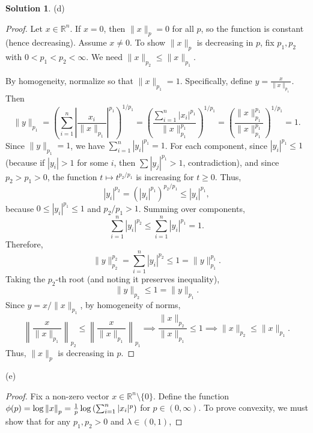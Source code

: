 \documentclass[12pt]{article}
\theoremstyle{definition}
\newtheorem*{solution}{\normalfont\textbf{Solution}}
\begin{document}
\begin{enumerate}[leftmargin=*]
\begin{solution}
        \item[(d)] 
            \begin{proof}
                Let \( x \in \mathbb{R}^n \). If \( x = 0 \), then \( \|x\|_p = 0 \) for all \( p \), so the function is constant (hence decreasing). Assume \( x \neq 0 \). To show \( \|x\|_p \) is decreasing in \( p \), fix \( p_1, p_2 \) with \( 0 < p_1 < p_2 < \infty \). We need \( \|x\|_{p_2} \leq \|x\|_{p_1} \).

                By homogeneity, normalize so that \( \|x\|_{p_1} = 1 \). Specifically, define \( y = \frac{x}{\|x\|_{p_1}} \). 
                Then \[ \|y\|_{p_1} = \left( \sum_{i=1}^n \left| \frac{x_i}{\|x\|_{p_1}} \right|^{p_1} \right)^{1/p_1} = \left( \frac{ \sum_{i=1}^n |x_i|^{p_1} }{ \|x\|_{p_1}^{p_1} } \right)^{1/p_1} = \left( \frac{ \|x\|_{p_1}^{p_1} }{ \|x\|_{p_1}^{p_1} } \right)^{1/p_1} = 1 .\] 
                Since \( \|y\|_{p_1} = 1 \), we have \( \sum_{i=1}^n |y_i|^{p_1} = 1 \). For each component, since \( |y_i|^{p_1} \leq 1 \) (because if \( |y_i| > 1 \) for some \( i \), then \( \sum |y_j|^{p_1} > 1 \), contradiction), and since \( p_2 > p_1 > 0 \), the function \( t \mapsto t^{p_2 / p_1} \) is increasing for \( t \geq 0 \). Thus,
                \[
                |y_i|^{p_2} = \left( |y_i|^{p_1} \right)^{p_2 / p_1} \leq |y_i|^{p_1},
                \]
                because \( 0 \leq |y_i|^{p_1} \leq 1 \) and \( p_2 / p_1 > 1 \). Summing over components,
                \[
                \sum_{i=1}^n |y_i|^{p_2} \leq \sum_{i=1}^n |y_i|^{p_1} = 1.
                \]
                Therefore,
                \[
                \|y\|_{p_2}^{p_2} = \sum_{i=1}^n |y_i|^{p_2} \leq 1 = \|y\|_{p_1}^{p_1}.
                \]
                Taking the \( p_2 \)-th root (and noting it preserves inequality),
                \[
                \|y\|_{p_2} \leq 1 = \|y\|_{p_1}.
                \]
                Since \( y = x / \|x\|_{p_1} \), by homogeneity of norms,
                \[
                \left\| \frac{x}{\|x\|_{p_1}} \right\|_{p_2} \leq \left\| \frac{x}{\|x\|_{p_1}} \right\|_{p_1} \implies \frac{ \|x\|_{p_2} }{ \|x\|_{p_1} } \leq 1 \implies \|x\|_{p_2} \leq \|x\|_{p_1}.
                \]
                Thus, \( \|x\|_p \) is decreasing in \( p \).
            \end{proof}
        \item[(e)]
            \begin{proof}
                Fix a non-zero vector \( x \in \mathbb{R}^n \setminus \{0\} \). Define the function \( \phi(p) = \log \norm{x}_p = \frac{1}{p} \log \left( \sum_{i=1}^n |x_i|^p \right) \) for \( p \in (0, \infty) \). To prove convexity, we must show that for any \( p_1, p_2 > 0 \) and \( \lambda \in (0,1) \),

\end{proof}
\end{solution}
\end{enumerate}
\end{document}
